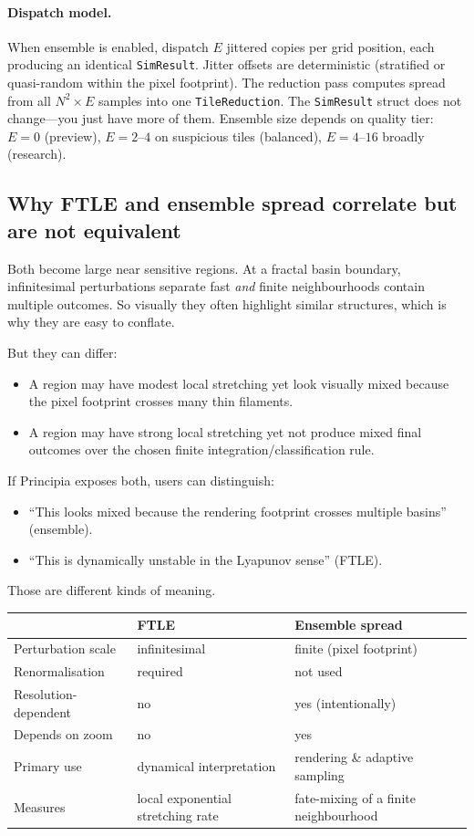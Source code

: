 \documentclass[11pt]{report}
\begin{document}
\paragraph{Dispatch model.} When ensemble is enabled, dispatch $E$ jittered copies per grid position, each producing an identical \texttt{SimResult}. Jitter offsets are deterministic (stratified or quasi-random within the pixel footprint). The reduction pass computes spread from all $N^2\times E$ samples into one \texttt{TileReduction}. The \texttt{SimResult} struct does not change---you just have more of them. Ensemble size depends on quality tier: $E=0$ (preview), $E=2$--$4$ on suspicious tiles (balanced), $E=4$--$16$ broadly (research).

\subsection{Why FTLE and ensemble spread correlate but are not equivalent}
\label{sec:ftle_vs_ensemble}

Both become large near sensitive regions. At a fractal basin boundary, infinitesimal perturbations separate fast \emph{and} finite neighbourhoods contain multiple outcomes. So visually they often highlight similar structures, which is why they are easy to conflate.

But they can differ:
\begin{itemize}[nosep]
\item A region may have modest local stretching yet look visually mixed because the pixel footprint crosses many thin filaments.
\item A region may have strong local stretching yet not produce mixed final outcomes over the chosen finite integration/classification rule.
\end{itemize}

If Principia exposes both, users can distinguish:
\begin{itemize}[nosep]
\item ``This looks mixed because the rendering footprint crosses multiple basins'' (ensemble).
\item ``This is dynamically unstable in the Lyapunov sense'' (FTLE).
\end{itemize}
Those are different kinds of meaning.

\begin{center}
\begin{tabular}{lll}
\toprule
& FTLE & Ensemble spread \\
\midrule
Perturbation scale & infinitesimal & finite (pixel footprint) \\
Renormalisation & required & not used \\
Resolution-dependent & no & yes (intentionally) \\
Depends on zoom & no & yes \\
Primary use & dynamical interpretation & rendering \& adaptive sampling \\
Measures & local exponential stretching rate & fate-mixing of a finite neighbourhood \\
\bottomrule
\end{tabular}
\end{center}
\end{document}
